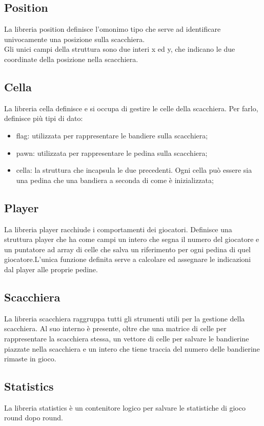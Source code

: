 \documentclass{article}
\begin{document}
\subsection{Position}
La libreria position definisce l'omonimo tipo che  serve ad identificare univocamente una posizione sulla scacchiera.\\ Gli unici campi della struttura sono due interi x ed y, che indicano le due coordinate della posizione nella scacchiera.

\subsection{Cella}
La libreria cella definisce e si occupa di gestire le celle della scacchiera. Per farlo, definisce più tipi di dato: 
\begin{itemize}
    \item flag: utilizzata per rappresentare le bandiere sulla scacchiera;
    \item pawn: utilizzata per rappresentare le pedina sulla scacchiera;
    \item cella: la struttura che incapsula le due precedenti. Ogni cella può essere sia una pedina che una bandiera a seconda di come è inizializzata;
\end{itemize}

\subsection{Player}
La libreria player racchiude i comportamenti dei giocatori. Definisce una struttura player che ha come campi un intero che segna il numero del giocatore e un puntatore ad array di celle che salva un riferimento per ogni pedina di quel giocatore.\newline L'unica funzione definita serve a calcolare ed assegnare le indicazioni dal player alle proprie pedine.

\subsection{Scacchiera}
La libreria scacchiera raggruppa tutti gli strumenti utili per la gestione della scacchiera. Al suo interno è presente, oltre che una matrice di celle per rappresentare la scacchiera stessa, un vettore di celle per salvare le bandierine piazzate nella scacchiera e un intero che tiene traccia del numero delle bandierine rimaste in gioco.

\subsection{Statistics}
La libreria statistics è un contenitore logico per salvare le statistiche di gioco round dopo round.
\end{document}
